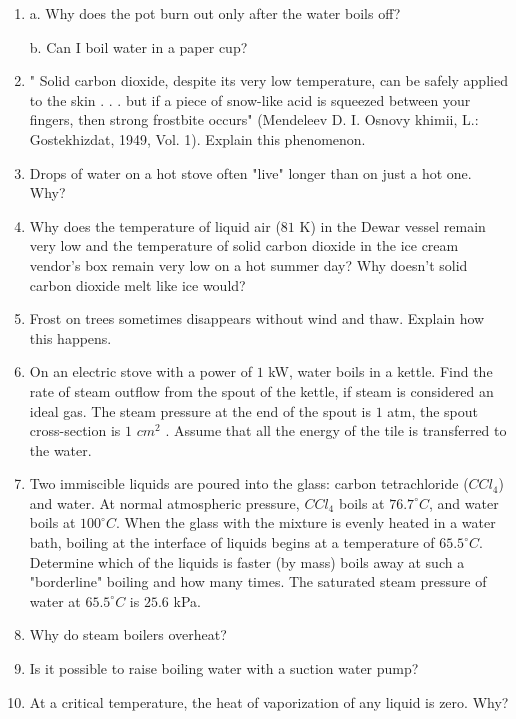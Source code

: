 \documentclass{article}
\begin{document}
\begin{enumerate}[label=5.10.\arabic*]
\item a. Why does the pot burn out only after the water boils off? 

b. Can I boil water in a paper cup?

\item " Solid carbon dioxide, despite its very low temperature, can be safely applied to the skin . . . but if a piece of snow-like acid is squeezed between your fingers, then strong frostbite occurs" (Mendeleev D. I. Osnovy khimii, L.: Gostekhizdat, 1949, Vol. 1). Explain this phenomenon.

\item Drops of water on a hot stove often "live" longer than on just a hot one. Why?

\item Why does the temperature of liquid air ($81$ K) in the Dewar vessel remain very low and the temperature of solid carbon dioxide in the ice cream vendor's box remain very low on a hot summer day? Why doesn't solid carbon dioxide melt like ice would?

\item Frost on trees sometimes disappears without wind and thaw. Explain how this happens.

\item On an electric stove with a power of $1$ kW, water boils in a kettle. Find the rate of steam outflow from the spout of the kettle, if steam is considered an ideal gas. The steam pressure at the end of the spout is $1$ atm, the spout cross-section is $1$ $cm^2$ . Assume that all the energy of the tile is transferred to the water.

\item Two immiscible liquids are poured into the glass: carbon tetrachloride ($CCl_4$) and water. At normal atmospheric pressure, $CCl_4$ boils at $76.7^\circ C$, and water boils at $100^\circ C$. When the glass with the mixture is evenly heated in a water bath, boiling at the interface of liquids begins at a temperature of $65.5^\circ C$. Determine which of the liquids is faster (by mass) boils away at such a "borderline" boiling and how many times. The saturated steam pressure of water at $65.5^\circ C$ is $25.6$ kPa.

\item Why do steam boilers overheat?

\item Is it possible to raise boiling water with a suction water pump?

\item At a critical temperature, the heat of vaporization of any liquid is zero. Why?


\end{enumerate}
\end{document}
